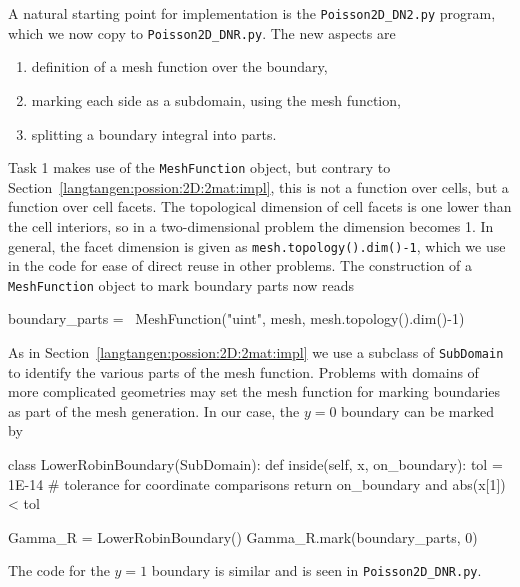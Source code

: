 A natural starting point for implementation is
the {\fontsize{10pt}{10pt}\verb!Poisson2D_DN2.py!} program, which we now copy to
{\fontsize{10pt}{10pt}\verb!Poisson2D_DNR.py!}. 
The new aspects are
\begin{enumerate}
\item definition of a mesh function over the boundary,
\item marking each side as a subdomain, using the mesh function,
\item splitting a boundary integral into parts.
\end{enumerate}

Task 1 makes use of the {\fontsize{10pt}{10pt}\texttt{MeshFunction}} object, but contrary to
Section~\ref{langtangen:possion:2D:2mat:impl}, this is not a function over
cells, but a function over cell facets. The topological dimension of
cell facets is one lower than the cell interiors, so in a two-dimensional
problem the dimension 
becomes 1. In general, the facet dimension 
is given as {\fontsize{10pt}{10pt}\texttt{mesh.topology().dim()-1}},
which we use in the code for ease of direct reuse in other problems.
The construction of a {\fontsize{10pt}{10pt}\texttt{MeshFunction}} object to mark boundary parts
now reads
\begin{python}
boundary_parts = \ 
  MeshFunction("uint", mesh, mesh.topology().dim()-1)
\end{python}
As in Section~\ref{langtangen:possion:2D:2mat:impl} we
use a subclass of {\fontsize{10pt}{10pt}\texttt{SubDomain}} to identify the various parts
of the mesh function. Problems with domains of more complicated geometries may
set the mesh function for marking boundaries as part of the mesh
generation.
In our case, the $y=0$ boundary can be marked by
\begin{python}
class LowerRobinBoundary(SubDomain):
    def inside(self, x, on_boundary):
        tol = 1E-14   # tolerance for coordinate comparisons
        return on_boundary and abs(x[1]) < tol

Gamma_R = LowerRobinBoundary()
Gamma_R.mark(boundary_parts, 0)
\end{python}
The code for the $y=1$ boundary is similar and is seen in
{\fontsize{10pt}{10pt}\verb!Poisson2D_DNR.py!}.

